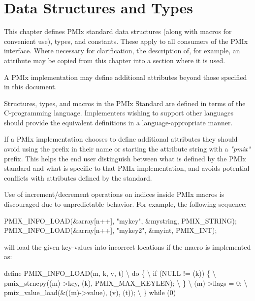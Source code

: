 \chapter{Data Structures and Types}
\label{chap:struct}

This chapter defines PMIx standard data structures (along with macros for convenient use), types, and constants.
These apply to all consumers of the PMIx interface.
Where necessary for clarification, the description of, for example, an attribute may be copied from this chapter into a section where it is used.

A PMIx implementation may define additional attributes beyond those specified in this document.

\adviceimplstart
Structures, types, and macros in the \ac{PMIx} Standard are defined in terms of the C-programming language. Implementers wishing to support other languages should provide the equivalent definitions in a language-appropriate manner.

If a PMIx implementation chooses to define additional attributes they should avoid using the  prefix in their name or starting the attribute string with a \textit{"pmix"} prefix.
This helps the end user distinguish between what is defined by the PMIx standard and what is specific to that PMIx implementation, and avoids potential conflicts with attributes defined by the standard.
\adviceimplend

\adviceuserstart
Use of increment/decrement operations on indices inside \ac{PMIx} macros is discouraged due to unpredictable behavior. For example, the following sequence:

\begin{codepar}
PMIX_INFO_LOAD(&array[n++], "mykey", &mystring, PMIX_STRING);
PMIX_INFO_LOAD(&array[n++], "mykey2", &myint, PMIX_INT);
\end{codepar}

will load the given key-values into incorrect locations if the macro is implemented as:

\begin{codepar}
define PMIX_INFO_LOAD(m, k, v, t)                      \textbackslash
  do \{                                                 \textbackslash
    if (NULL != (k)) \{                                 \textbackslash
      pmix_strncpy((m)->key, (k), PMIX_MAX_KEYLEN);    \textbackslash
    \}                                                  \textbackslash
    (m)->flags = 0;                                    \textbackslash
    pmix_value_load(&((m)->value), (v), (t));          \textbackslash
  \} while (0)
\end{codepar}

